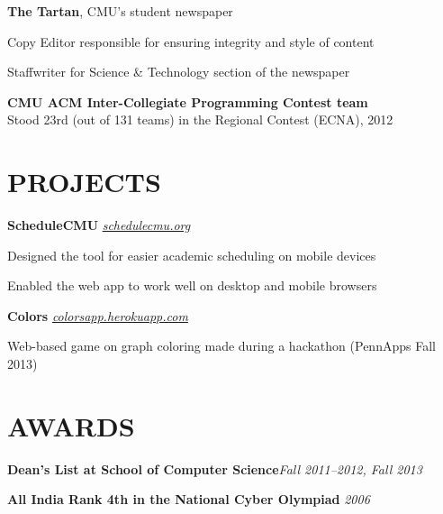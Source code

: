 \documentclass[margin, 11pt]{res} %
\begin{document}
\begin{resume}
\vspace{3pt}

{\bf The Tartan}, CMU's student newspaper

\begin{itemize} \itemsep -2pt
{\small \item Copy Editor responsible for ensuring integrity and style of content
\item Staffwriter for Science \& Technology section of the newspaper}
\end{itemize}

\vspace{3pt}

{\bf CMU ACM Inter-Collegiate Programming Contest team}\\
{\small Stood 23rd (out of 131 teams) in the Regional Contest (ECNA), 2012}


\section{PROJECTS}

{\bf ScheduleCMU} \href{www.schedulecmu.org}{\sl schedulecmu.org}

\begin{itemize} \itemsep -2pt
{\small \item Designed the tool for easier academic scheduling on mobile devices
\item Enabled the web app to work well on desktop and mobile browsers}
\end{itemize}

\vspace{3pt}

{\bf Colors} \href{colorsapp.herokuapp.com}{\sl colorsapp.herokuapp.com}

{\small Web-based game on graph coloring made during a hackathon (PennApps Fall 2013)}




\section{AWARDS}

{\bf Dean's List at School of Computer Science}\hfill {\small \sl Fall 2011--2012, Fall 2013}

\vspace{5pt}

{\bf All India Rank 4th in the National Cyber Olympiad} \hfill {\small \sl 2006}


\end{resume}
\end{document}
